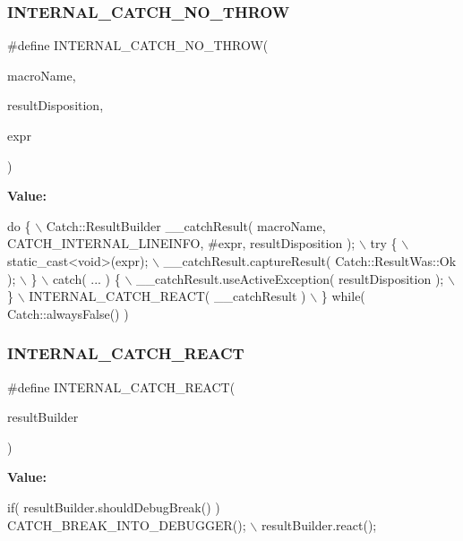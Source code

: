 \subsubsection{I\+N\+T\+E\+R\+N\+A\+L\+\_\+\+C\+A\+T\+C\+H\+\_\+\+N\+O\+\_\+\+T\+H\+R\+OW}
{\footnotesize\ttfamily \#define I\+N\+T\+E\+R\+N\+A\+L\+\_\+\+C\+A\+T\+C\+H\+\_\+\+N\+O\+\_\+\+T\+H\+R\+OW(\begin{DoxyParamCaption}\item[{}]{macro\+Name,  }\item[{}]{result\+Disposition,  }\item[{}]{expr }\end{DoxyParamCaption})}

{\bfseries Value\+:}
\begin{DoxyCode}
\textcolor{keywordflow}{do} \{ \(\backslash\)
        Catch::ResultBuilder \_\_catchResult( macroName, CATCH_INTERNAL_LINEINFO, #expr, resultDisposition );
       \(\backslash\)
        try \{ \(\backslash\)
            static\_cast<\textcolor{keywordtype}{void}>(expr); \(\backslash\)
            \_\_catchResult.captureResult( Catch::ResultWas::Ok ); \(\backslash\)
        \} \(\backslash\)
        catch( ... ) \{ \(\backslash\)
            \_\_catchResult.useActiveException( resultDisposition ); \(\backslash\)
        \} \(\backslash\)
        INTERNAL\_CATCH\_REACT( \_\_catchResult ) \(\backslash\)
    \} \textcolor{keywordflow}{while}( Catch::alwaysFalse() )
\end{DoxyCode}
\mbox{\label{catch_8hpp_a345ec5265fc806d64c3dda4c184e8071}} 
\subsubsection{I\+N\+T\+E\+R\+N\+A\+L\+\_\+\+C\+A\+T\+C\+H\+\_\+\+R\+E\+A\+CT}
{\footnotesize\ttfamily \#define I\+N\+T\+E\+R\+N\+A\+L\+\_\+\+C\+A\+T\+C\+H\+\_\+\+R\+E\+A\+CT(\begin{DoxyParamCaption}\item[{}]{result\+Builder }\end{DoxyParamCaption})}

{\bfseries Value\+:}
\begin{DoxyCode}
\textcolor{keywordflow}{if}( resultBuilder.shouldDebugBreak() ) CATCH_BREAK_INTO_DEBUGGER(); \(\backslash\)
    resultBuilder.react();
\end{DoxyCode}
\mbox{\label{catch_8hpp_a2c89fdef42502a2b2e34b58cea9f68ff}} 
